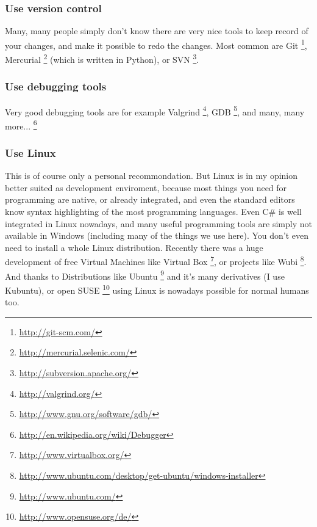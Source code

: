 \documentclass[letterpaper,10pt,english]{manual}
\begin{document}
\subsubsection{Use version control}

Many, many people simply don't know there are very nice
tools to keep record of your changes, and make it possible
to redo the changes. Most common are Git \footnote{
\href{http://git-scm.com/}{http://git-scm.com/}
}, Mercurial \footnote{
\href{http://mercurial.selenic.com/}{http://mercurial.selenic.com/}
} (which is written in Python),
or SVN \footnote{
\href{http://subversion.apache.org/}{http://subversion.apache.org/}
}.


\subsubsection{Use debugging tools}

Very good debugging tools are for example Valgrind \footnote{
\href{http://valgrind.org/}{http://valgrind.org/}
}, GDB \footnote{
\href{http://www.gnu.org/software/gdb/}{http://www.gnu.org/software/gdb/}
},
and many, many more... \footnote{
\href{http://en.wikipedia.org/wiki/Debugger}{http://en.wikipedia.org/wiki/Debugger}
}


\subsubsection{Use Linux}

This is of course only a personal recommondation. But Linux is in my opinion better
suited as development enviroment, because most things you need for programming are native, or
already integrated, and even the standard editors know syntax highlighting of the most programming
languages. Even C\# is well integrated in Linux nowadays, and many useful programming tools are simply not
available in Windows (including many of the things we use here).
You don't even need to install a whole Linux distribution. Recently there was a huge development of free
Virtual Machines like Virtual Box \footnote{
\href{http://www.virtualbox.org/}{http://www.virtualbox.org/}
}, or projects like Wubi \footnote{
\href{http://www.ubuntu.com/desktop/get-ubuntu/windows-installer}{http://www.ubuntu.com/desktop/get-ubuntu/windows-installer}
}. And thanks to Distributions like
Ubuntu \footnote{
\href{http://www.ubuntu.com/}{http://www.ubuntu.com/}
}  and it's many derivatives (I use Kubuntu), or open SUSE \footnote{
\href{http://www.opensuse.org/de/}{http://www.opensuse.org/de/}
} using Linux is nowadays possible for
normal humans too.
\end{document}
